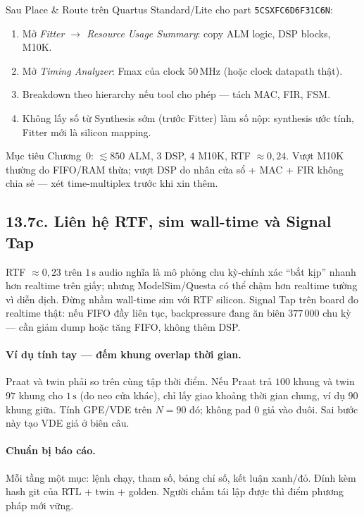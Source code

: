 Sau Place \& Route trên Quartus Standard/Lite cho part \texttt{5CSXFC6D6F31C6N}:
\begin{enumerate}[leftmargin=1.4em]
  \item Mở \emph{Fitter $\to$ Resource Usage Summary}: copy ALM logic, DSP blocks, M10K.
  \item Mở \emph{Timing Analyzer}: Fmax của clock $50\,\text{MHz}$ (hoặc clock datapath thật).
  \item Breakdown theo hierarchy nếu tool cho phép --- tách MAC, FIR, FSM.
  \item Không lấy số từ Synthesis sớm (trước Fitter) làm số nộp: synthesis ước tính, Fitter mới là silicon mapping.
\end{enumerate}
Mục tiêu Chương~0: $\lesssim 850$ ALM, $3$ DSP, $4$ M10K, RTF $\approx 0{,}24$. Vượt M10K thường do FIFO/RAM thừa; vượt DSP do nhân cửa sổ + MAC + FIR không chia sẻ --- xét time-multiplex trước khi xin thêm.


\subsection*{13.7c. Liên hệ RTF, sim wall-time và Signal Tap}

RTF $\approx 0{,}23$ trên $1\,\text{s}$ audio nghĩa là mô phỏng chu kỳ-chính xác ``bắt kịp'' nhanh hơn realtime trên giấy; nhưng ModelSim/Questa có thể chậm hơn realtime tường vì diễn dịch. Đừng nhầm wall-time sim với RTF silicon. Signal Tap trên board đo realtime thật: nếu FIFO đầy liên tục, backpressure đang ăn biên $377\,000$ chu kỳ --- cần giảm dump hoặc tăng FIFO, không thêm DSP.

\paragraph{Ví dụ tính tay --- đếm khung overlap thời gian.} Praat và twin phải so trên cùng tập thời điểm. Nếu Praat trả $100$ khung và twin $97$ khung cho $1\,\text{s}$ (do neo cửa khác), chỉ lấy giao khoảng thời gian chung, ví dụ $90$ khung giữa. Tính GPE/VDE trên $N=90$ đó; không pad $0$ giả vào đuôi. Sai bước này tạo VDE giả ở biên câu.

\paragraph{Chuẩn bị báo cáo.} Mỗi tầng một mục: lệnh chạy, tham số, bảng chỉ số, kết luận xanh/đỏ. Đính kèm hash git của RTL + twin + golden. Người chấm tái lập được thì điểm phương pháp mới vững.

